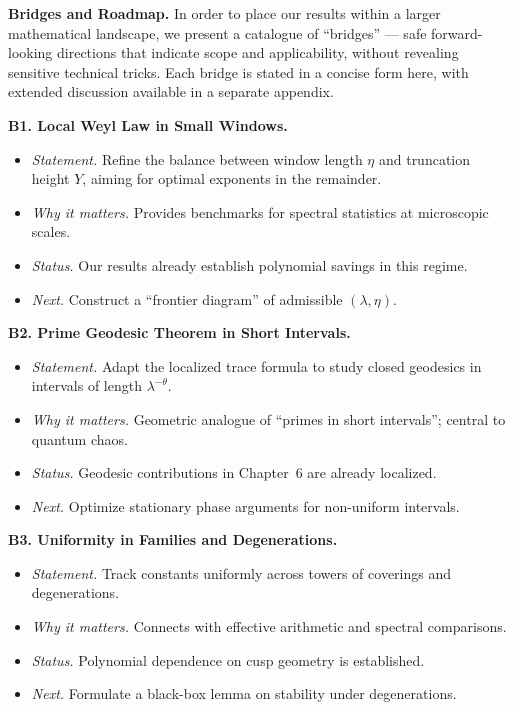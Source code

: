 \medskip
\noindent\textbf{Bridges and Roadmap.}
In order to place our results within a larger mathematical landscape, we present a catalogue of ``bridges'' --- safe forward-looking directions that indicate scope and applicability, without revealing sensitive technical tricks. Each bridge is stated in a concise form here, with extended discussion available in a separate appendix.

\medskip
\noindent\textbf{B1. Local Weyl Law in Small Windows.}
\begin{itemize}
  \item \emph{Statement.} Refine the balance between window length $\eta$ and truncation height $Y$, aiming for optimal exponents in the remainder.
  \item \emph{Why it matters.} Provides benchmarks for spectral statistics at microscopic scales.
  \item \emph{Status.} Our results already establish polynomial savings in this regime.
  \item \emph{Next.} Construct a ``frontier diagram'' of admissible $(\lambda,\eta)$.
\end{itemize}

\medskip
\noindent\textbf{B2. Prime Geodesic Theorem in Short Intervals.}
\begin{itemize}
  \item \emph{Statement.} Adapt the localized trace formula to study closed geodesics in intervals of length $\lambda^{-\theta}$.
  \item \emph{Why it matters.} Geometric analogue of ``primes in short intervals''; central to quantum chaos.
  \item \emph{Status.} Geodesic contributions in Chapter~6 are already localized.
  \item \emph{Next.} Optimize stationary phase arguments for non-uniform intervals.
\end{itemize}

\medskip
\noindent\textbf{B3. Uniformity in Families and Degenerations.}
\begin{itemize}
  \item \emph{Statement.} Track constants uniformly across towers of coverings and degenerations.
  \item \emph{Why it matters.} Connects with effective arithmetic and spectral comparisons.
  \item \emph{Status.} Polynomial dependence on cusp geometry is established.
  \item \emph{Next.} Formulate a black-box lemma on stability under degenerations.
\end{itemize}

